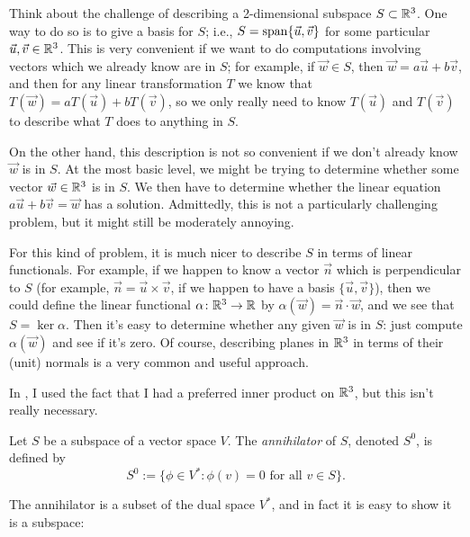 \begin{example}\label{ex:planes in R3}
	Think about the challenge of describing a 2-dimensional subspace $S \subset \mathbb{R}^3$. One way to do so is to give a basis for $S$; i.e., $S = \operatorname{span}\{\vec{u},\vec{v}\}$ for some particular $\vec{u} , \vec{v} \in \mathbb{R}^3$. This is very convenient if we want to do computations involving vectors which we already know are in $S$; for example, if $ \vec{w} \in S$, then $\vec{w} = a \vec{u} + b \vec{v}$, and then for any linear transformation $T$ we know that $T(\vec{w}) = a T(\vec{u}) + b T(\vec{v})$, so we only really need to know $T(\vec{u})$ and $T(\vec{v})$ to describe what $T$ does to anything in $S$.
	
	On the other hand, this description is not so convenient if we don't already know $\vec{w}$ is in $S$. At the most basic level, we might be trying to determine whether some vector $\vec{w} \in \mathbb{R}^3$ is in $S$. We then have to determine whether the linear equation $a \vec{u} + b \vec{v} = \vec{w}$ has a solution. Admittedly, this is not a particularly challenging problem, but it might still be moderately annoying. 
	
	For this kind of problem, it is much nicer to describe $S$ in terms of linear functionals. For example, if we happen to know a vector $\vec{n}$ which is perpendicular to $S$ (for example, $\vec{n} = \vec{u} \times \vec{v}$, if we happen to have a basis $\{\vec{u}, \vec{v}\}$), then we could define the linear functional $\alpha \colon\thinspace\! \mathbb{R}^3 \to \mathbb{R}$ by $\alpha(\vec{w}) = \vec{n} \cdot \vec{w}$, and we see that $S = \ker \alpha$. Then it's easy to determine whether any given $\vec{w}$ is in $S$: just compute $\alpha(\vec{w})$ and see if it's zero. Of course, describing planes in $\mathbb{R}^3$ in terms of their (unit) normals is a very common and useful approach.
\end{example}

In , I used the fact that I had a preferred inner product on $\mathbb{R}^3$, but this isn't really necessary.

\begin{definition}\label{def:annihilator}
	Let $S$ be a subspace of a vector space $V$. The \emph{annihilator} of $S$, denoted $S^0$, is defined by
	\[
		S^0 := \{\phi \in V^\ast : \phi(v) = 0 \text{ for all } v \in S\}.
	\]
\end{definition}

The annihilator is a subset of the dual space $V^\ast$, and in fact it is easy to show it is a subspace:

